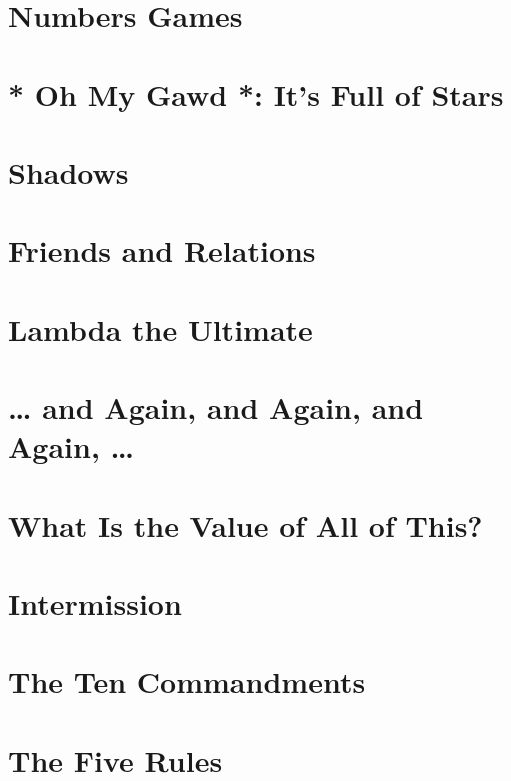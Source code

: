 \documentclass[11pt]{article}
\begin{document}
\newpage

\section{Numbers Games}
\label{sec:org0fd4909}

\newpage

\section{* Oh My Gawd *: It's Full of Stars}
\label{sec:orga8a2bed}

\newpage

\section{Shadows}
\label{sec:org40c8e62}

\newpage

\section{Friends and Relations}
\label{sec:org3e22616}

\newpage

\section{Lambda the Ultimate}
\label{sec:orgfebdd83}

\newpage

\section{\ldots{} and Again, and Again, and Again, \ldots{}}
\label{sec:orgca2bcab}

\newpage

\section{What Is the Value of All of This?}
\label{sec:org0f34921}

\newpage

\section{Intermission}
\label{sec:org61d0f99}

\newpage

\section{The Ten Commandments}
\label{sec:orgec5acdb}

\newpage

\section{The Five Rules}
\label{sec:org03bf191}

\newpage
\end{document}
